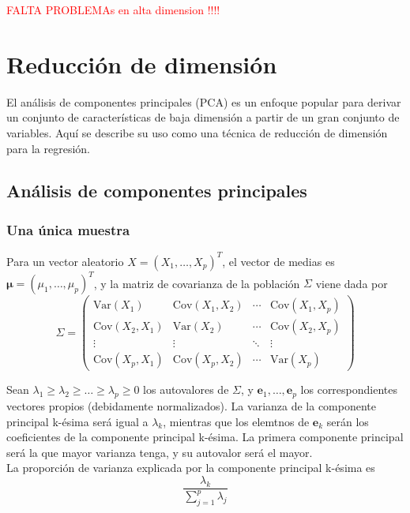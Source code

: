 \textcolor{red}{FALTA PROBLEMAs en alta dimension !!!!}

\section{Reducción de dimensión}

El análisis de componentes principales (PCA) es un enfoque popular para derivar un conjunto de características de baja dimensión a partir de un gran conjunto de variables. Aquí se describe su uso como una técnica de reducción de dimensión para la regresión.

\subsection{Análisis de componentes principales}

\subsubsection{Una única muestra}

Para un vector aleatorio $X = (X_1, \dots, X_p)^T$, el vector de medias es $\boldsymbol{\mu} = (\mu_1, \dots, \mu_p)^T$, y la matriz de covarianza de la población $\Sigma$ viene dada por 
\begin{equation}
\Sigma = \begin{pmatrix}
\text{Var}(X_1) & \text{Cov}(X_1, X_2) & \cdots & \text{Cov}(X_1, X_p) \\
\text{Cov}(X_2, X_1) & \text{Var}(X_2) & \cdots & \text{Cov}(X_2, X_p) \\
\vdots & \vdots & \ddots & \vdots \\
\text{Cov}(X_p, X_1) & \text{Cov}(X_p, X_2) & \cdots & \text{Var}(X_p)
\end{pmatrix}
\end{equation}

Sean $\lambda_1 \geq \lambda_2  \geq \dots \geq \lambda_p \geq 0$ los autovalores de $\Sigma$, y $\mathbf{e}_1, \dots, \mathbf{e}_p$ los correspondientes vectores propios (debidamente normalizados). La varianza de la componente principal k-ésima será igual a $\lambda_k$, mientras que los elemtnos de $\mathbf{e}_k$ serán los coeficientes de la componente principal k-ésima. La primera componente principal será la que mayor varianza tenga, y su autovalor será el mayor. \\

\noindent La proporción de varianza explicada por la componente principal k-ésima es 
\begin{equation}
\frac{\lambda_k}{\sum_{j=1}^p \lambda_j}
\end{equation}

